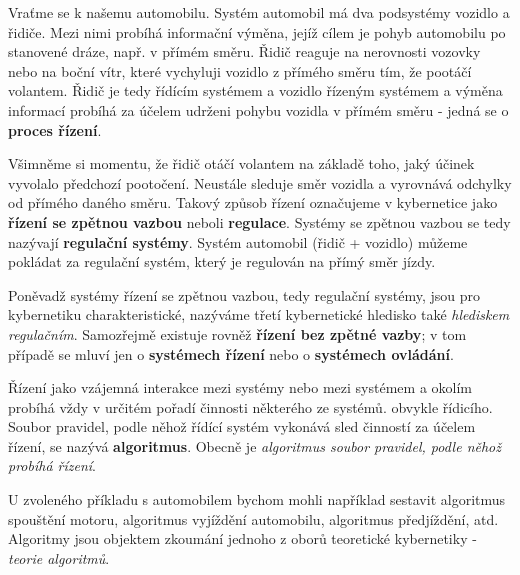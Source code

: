       Vraťme se k našemu automobilu. Systém automobil má dva podsystémy vozidlo a řidiče. Mezi nimi 
      probíhá informační výměna, jejíž cílem je pohyb automobilu po stanovené dráze, např. v přímém 
      směru. Řidič reaguje na nerovnosti vozovky nebo na boční vítr, které vychyluji vozidlo z 
      přímého směru tím, že pootáčí volantem. Řidič je tedy řídícím systémem a vozidlo řízeným 
      systémem a výměna informací probíhá za účelem udrženi pohybu vozidla v přímém směru - jedná 
      se o \textbf{proces řízení}.
      
      Všimněme si momentu, že řidič otáčí volantem na základě toho, jaký účinek vyvolalo předchozí 
      pootočení. Neustále sleduje směr vozidla a vyrovnává odchylky od přímého daného směru. Takový 
      způsob řízení označujeme v kybernetice jako \textbf{řízení se zpětnou vazbou} neboli 
      \textbf{regulace}. Systémy se zpětnou vazbou se tedy nazývají \textbf{regulační systémy}. 
      Systém automobil (řidič + vozidlo) můžeme pokládat za regulační systém, který je regulován na 
      přímý směr jízdy.
      
      Poněvadž systémy řízení se zpětnou vazbou, tedy regulační systémy, jsou pro kybernetiku 
      charakteristické, nazýváme třetí kybernetické hledisko také \emph{hlediskem regulačním}. 
      Samozřejmě existuje rovněž \textbf{řízení bez zpětné vazby}; v tom případě se mluví jen o 
      \textbf{systémech řízení} nebo o \textbf{systémech ovládání}.
      
      Řízení jako vzájemná interakce mezi systémy nebo mezi systémem a okolím probíhá vždy v 
      určitém pořadí činnosti některého ze systémů. obvykle řídicího. Soubor pravidel, podle něhož 
      řídící systém vykonává sled činností za účelem řízení, se nazývá \textbf{algoritmus}. Obecně 
      je \emph{algoritmus soubor pravidel, podle něhož probíhá řízení}.
      
      U zvoleného příkladu s automobilem bychom mohli například sestavit algoritmus spouštění 
      motoru, algoritmus vyjíždění automobilu, algoritmus předjíždění, atd. Algoritmy jsou objektem 
      zkoumání jednoho z oborů teoretické kybernetiky - \emph{teorie algoritmů}.
      

